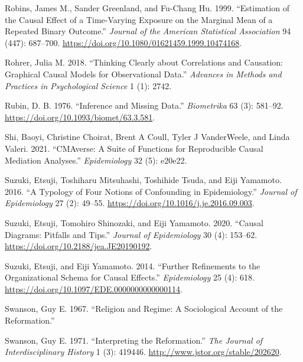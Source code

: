 \documentclass[
  singlecolumn]{article}
\newlength{\cslhangindent}
\newlength{\cslentryspacingunit} %
\newenvironment{CSLReferences}[2] %
 {%
  \setlength{\parindent}{0pt}
  \ifodd #1
  \let\oldpar\par
  \def\par{\hangindent=\cslhangindent\oldpar}
  \fi
  \setlength{\parskip}{#2\cslentryspacingunit}
 }%
 {}
\begin{document}
\begin{CSLReferences}{1}{0}
\leavevmode{}%
Robins, James M., Sander Greenland, and Fu-Chang Hu. 1999. {``Estimation
of the Causal Effect of a Time-Varying Exposure on the Marginal Mean of
a Repeated Binary Outcome.''} \emph{Journal of the American Statistical
Association} 94 (447): 687--700.
\url{https://doi.org/10.1080/01621459.1999.10474168}.

\leavevmode{}%
Rohrer, Julia M. 2018. {``Thinking Clearly about Correlations and
Causation: Graphical Causal Models for Observational Data.''}
\emph{Advances in Methods and Practices in Psychological Science} 1 (1):
2742.

\leavevmode{}%
Rubin, D. B. 1976. {``Inference and Missing Data.''} \emph{Biometrika}
63 (3): 581--92. \url{https://doi.org/10.1093/biomet/63.3.581}.

\leavevmode{}%
Shi, Baoyi, Christine Choirat, Brent A Coull, Tyler J VanderWeele, and
Linda Valeri. 2021. {``CMAverse: A Suite of Functions for Reproducible
Causal Mediation Analyses.''} \emph{Epidemiology} 32 (5): e20e22.

\leavevmode{}%
Suzuki, Etsuji, Toshiharu Mitsuhashi, Toshihide Tsuda, and Eiji
Yamamoto. 2016. {``A Typology of Four Notions of Confounding in
Epidemiology.''} \emph{Journal of Epidemiology} 27 (2): 49--55.
\url{https://doi.org/10.1016/j.je.2016.09.003}.

\leavevmode{}%
Suzuki, Etsuji, Tomohiro Shinozaki, and Eiji Yamamoto. 2020. {``Causal
Diagrams: Pitfalls and Tips.''} \emph{Journal of Epidemiology} 30 (4):
153--62. \url{https://doi.org/10.2188/jea.JE20190192}.

\leavevmode{}%
Suzuki, Etsuji, and Eiji Yamamoto. 2014. {``Further Refinements to the
Organizational Schema for Causal Effects.''} \emph{Epidemiology} 25 (4):
618. \url{https://doi.org/10.1097/EDE.0000000000000114}.

\leavevmode{}%
Swanson, Guy E. 1967. {``Religion and Regime: A Sociological Account of
the Reformation.''}

\leavevmode{}%
Swanson, Guy E. 1971. {``Interpreting the Reformation.''} \emph{The
Journal of Interdisciplinary History} 1 (3): 419446.
\url{http://www.jstor.org/stable/202620}.


\end{CSLReferences}
\end{document}
